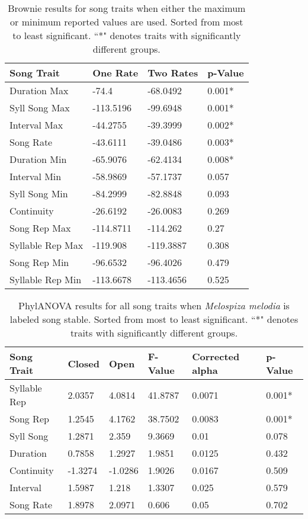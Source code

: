 \documentclass[a4paper,12pt]{article}
\begin{document}
\begin{table}[ht]
\caption{Brownie results for song traits when either the maximum or minimum reported values are used.  Sorted from most to least significant.  ``*" denotes traits with significantly different groups.}
\centering
\begin{tabular}{llll}
  \hline
Song Trait & One Rate & Two Rates & p-Value \\ 
  \hline
Duration Max & -74.4 & -68.0492 & 0.001* \\ 
  Syll Song Max & -113.5196 & -99.6948 & 0.001* \\ 
  Interval Max & -44.2755 & -39.3999 & 0.002* \\ 
  Song Rate & -43.6111 & -39.0486 & 0.003* \\ 
  Duration Min & -65.9076 & -62.4134 & 0.008* \\ 
  Interval Min & -58.9869 & -57.1737 & 0.057 \\ 
  Syll Song Min & -84.2999 & -82.8848 & 0.093 \\ 
  Continuity & -26.6192 & -26.0083 & 0.269 \\ 
  Song Rep Max & -114.8711 & -114.262 & 0.27 \\ 
  Syllable Rep Max & -119.908 & -119.3887 & 0.308 \\ 
  Song Rep Min & -96.6532 & -96.4026 & 0.479 \\ 
  Syllable Rep Min & -113.6678 & -113.4656 & 0.525 \\ 
   \hline
\end{tabular}
\end{table}

\begin{table}[ht]
\caption{PhylANOVA results for all song traits when \textit{Melospiza melodia} is labeled song stable.  Sorted from most to least significant.  ``*" denotes traits with significantly different groups.}
\centering
\begin{tabular}{llllll}
  \hline
Song Trait & Closed & Open & F-Value & Corrected alpha & p-Value \\ 
  \hline
Syllable Rep & 2.0357 & 4.0814 & 41.8787 & 0.0071 & 0.001* \\ 
  Song Rep & 1.2545 & 4.1762 & 38.7502 & 0.0083 & 0.001* \\ 
  Syll Song & 1.2871 & 2.359 & 9.3669 & 0.01 & 0.078 \\ 
  Duration & 0.7858 & 1.2927 & 1.9851 & 0.0125 & 0.432 \\ 
  Continuity & -1.3274 & -1.0286 & 1.9026 & 0.0167 & 0.509 \\ 
  Interval & 1.5987 & 1.218 & 1.3307 & 0.025 & 0.579 \\ 
  Song Rate & 1.8978 & 2.0971 & 0.606 & 0.05 & 0.702 \\ 
   \hline
\end{tabular}
\end{table}
\end{document}
